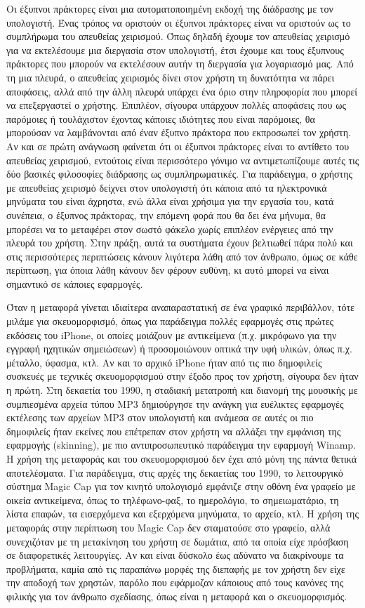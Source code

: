 \documentclass[
]{article}
\begin{document}
Οι έξυπνοι πράκτορες είναι μια αυτοματοποιημένη εκδοχή της διάδρασης με
τον υπολογιστή. Ένας τρόπος να οριστούν οι έξυπνοι πράκτορες είναι να
οριστούν ως το συμπλήρωμα του απευθείας χειρισμού. Όπως δηλαδή έχουμε
τον απευθείας χειρισμό για να εκτελέσουμε μια διεργασία στον υπολογιστή,
έτσι έχουμε και τους έξυπνους πράκτορες που μπορούν να εκτελέσουν αυτήν
τη διεργασία για λογαριασμό μας. Από τη μια πλευρά, ο απευθείας
χειρισμός δίνει στον χρήστη τη δυνατότητα να πάρει αποφάσεις, αλλά από
την άλλη πλευρά υπάρχει ένα όριο στην πληροφορία που μπορεί να
επεξεργαστεί ο χρήστης. Επιπλέον, σίγουρα υπάρχουν πολλές αποφάσεις που
ως παρόμοιες ή τουλάχιστον έχοντας κάποιες ιδιότητες που είναι
παρόμοιες, θα μπορούσαν να λαμβάνονται από έναν έξυπνο πράκτορα που
εκπροσωπεί τον χρήστη. Αν και σε πρώτη ανάγνωση φαίνεται ότι οι έξυπνοι
πράκτορες είναι το αντίθετο του απευθείας χειρισμού, εντούτοις είναι
περισσότερο γόνιμο να αντιμετωπίζουμε αυτές τις δύο βασικές φιλοσοφίες
διάδρασης ως συμπληρωματικές. Για παράδειγμα, ο χρήστης με απευθείας
χειρισμό δείχνει στον υπολογιστή ότι κάποια από τα ηλεκτρονικά μηνύματα
του είναι άχρηστα, ενώ άλλα είναι χρήσιμα για την εργασία του, κατά
συνέπεια, ο έξυπνος πράκτορας, την επόμενη φορά που θα δει ένα μήνυμα,
θα μπορέσει να το μεταφέρει στον σωστό φάκελο χωρίς επιπλέον ενέργειες
από την πλευρά του χρήστη. Στην πράξη, αυτά τα συστήματα έχουν βελτιωθεί
πάρα πολύ και στις περισσότερες περιπτώσεις κάνουν λιγότερα λάθη από τον
άνθρωπο, όμως σε κάθε περίπτωση, για όποια λάθη κάνουν δεν φέρουν
ευθύνη, κι αυτό μπορεί να είναι σημαντικό σε κάποιες εφαρμογές.

Όταν η μεταφορά γίνεται ιδιαίτερα αναπαραστατική σε ένα γραφικό
περιβάλλον, τότε μιλάμε για σκευομορφισμό, όπως για παράδειγμα πολλές
εφαρμογές στις πρώτες εκδόσεις του iPhone, οι οποίες μοιάζουν με
αντικείμενα (π.χ. μικρόφωνο για την εγγραφή ηχητικών σημειώσεων) ή
προσομοιώνουν οπτικά την υφή υλικών, όπως π.χ. μέταλλο, ύφασμα, κτλ. Αν
και το αρχικό iPhone ήταν από τις πιο δημοφιλείς συσκευές με τεχνικές
σκευομορφισμού στην έξοδο προς τον χρήστη, σίγουρα δεν ήταν η πρώτη. Στη
δεκαετία του 1990, η σταδιακή μετατροπή και διανομή της μουσικής με
συμπιεσμένα αρχεία τύπου MP3 δημιούργησε την ανάγκη για ευέλικτες
εφαρμογές εκτέλεσης των αρχείων MP3 στον υπολογιστή και ανάμεσα σε αυτές
οι πιο δημοφιλείς ήταν εκείνες που επέτρεπαν στον χρήστη να αλλάξει την
εμφάνιση της εφαρμογής (skinning), με πιο αντιπροσωπευτικό παράδειγμα
την εφαρμογή Winamp. Η χρήση της μεταφοράς και του σκευομορφισμού δεν
έχει από μόνη της πάντα θετικά αποτελέσματα. Για παράδειγμα, στις αρχές
της δεκαετίας του 1990, το λειτουργικό σύστημα Magic Cap για τον κινητό
υπολογισμό εμφάνιζε στην οθόνη ένα γραφείο με οικεία αντικείμενα, όπως
το τηλέφωνο-φαξ, το ημερολόγιο, το σημειωματάριο, τη λίστα επαφών, τα
εισερχόμενα και εξερχόμενα μηνύματα, το αρχείο, κτλ. Η χρήση της
μεταφοράς στην περίπτωση του Magic Cap δεν σταματούσε στο γραφείο, αλλά
συνεχιζόταν με τη μετακίνηση του χρήστη σε δωμάτια, από τα οποία είχε
πρόσβαση σε διαφορετικές λειτουργίες. Αν και είναι δύσκολο έως αδύνατο
να διακρίνουμε τα προβλήματα, καμία από τις παραπάνω μορφές της διεπαφής
με τον χρήστη δεν είχε την αποδοχή των χρηστών, παρόλο που εφάρμοζαν
κάποιους από τους κανόνες της φιλικής για τον άνθρωπο σχεδίασης, όπως
είναι η μεταφορά και ο σκευομορφισμός.
\end{document}
